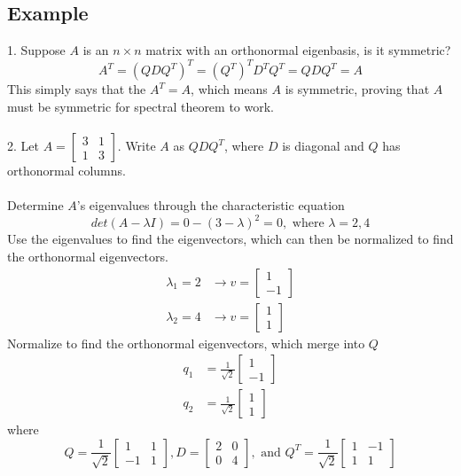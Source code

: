 \begin{enumerate}
\subsection{Example}
1. Suppose $A$ is an $n \times n$ matrix with an orthonormal eigenbasis, is it symmetric? 
\[
  A^T = (QDQ^T)^T = (Q^T)^TD^TQ^T = QDQ^T = A
\]
This simply says that the $A^T = A$, which means $A$ is symmetric, proving that $A$ must be symmetric for spectral theorem to work. \\\\
2. Let $A = \begin{bmatrix} 3 & 1 \\ 1 & 3 \end{bmatrix}$. Write 
  $A$ as $QDQ^T$, where $D$ is diagonal and $Q$ has orthonormal columns. 
\\\\ Determine $A$'s eigenvalues through the characteristic equation
\[
  det(A - \lambda I) = 0 - (3 - \lambda)^2 = 0, \text{ where } 
  \lambda = 2, 4
\]
Use the eigenvalues to find the eigenvectors, which can then be normalized to find the orthonormal eigenvectors. 
\[
  \begin{aligned}
    \lambda_1 = 2 &\rightarrow v = \begin{bmatrix} 1 \\ -1 \end{bmatrix} \\
    \lambda_2 = 4 &\rightarrow v = \begin{bmatrix} 1 \\ 1 \end{bmatrix}
  \end{aligned}
\]
Normalize to find the orthonormal eigenvectors, which merge into $Q$ 
\[
  \begin{aligned}
    q_1 &= \frac{1}{\sqrt{2}} \begin{bmatrix} 1 \\ -1 \end{bmatrix} \\
    q_2 &= \frac{1}{\sqrt{2}} \begin{bmatrix} 1 \\ 1 \end{bmatrix}
  \end{aligned}
\]
where 
\[
  Q = \frac{1}{\sqrt{2}} \begin{bmatrix} 1 & 1 \\ -1 & 1 \end{bmatrix}, 
  D = \begin{bmatrix} 2 & 0 \\ 0 & 4 \end{bmatrix}, 
  \text{ and } Q^T = \frac{1}{\sqrt{2}}\begin{bmatrix} 1 & -1 \\ 1 & 1 \end{bmatrix}
\]

\end{enumerate}
